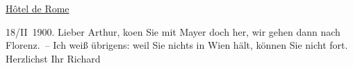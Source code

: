 \pstart
           {\pb}\uline{Hôtel de Rome}\pend
           
\pstart
           \raggedleft{}18/II 1900.\pend
           \pend
           \vspace{0.5em}
\pstart
           Lieber Arthur, ko{\geminationm}en Sie mit Mayer doch her, wir gehen dann nach Florenz. – Ich weiß übrigens: weil Sie nichts in
                  Wien hält, können Sie nicht fort. Herzlichst
               Ihr\pend
           \pstart \spacefill\mbox{Richard}\pend{}\endnumbering{}  \newcommand{\dateiname}{L01015}\newcommand{\titel}{Richard Beer-Hofmann an Arthur Schnitzler, 18. 2. 1900}\newcommand{\editorInnen}{Martin Anton Müller und Gerd-Hermann Susen}
